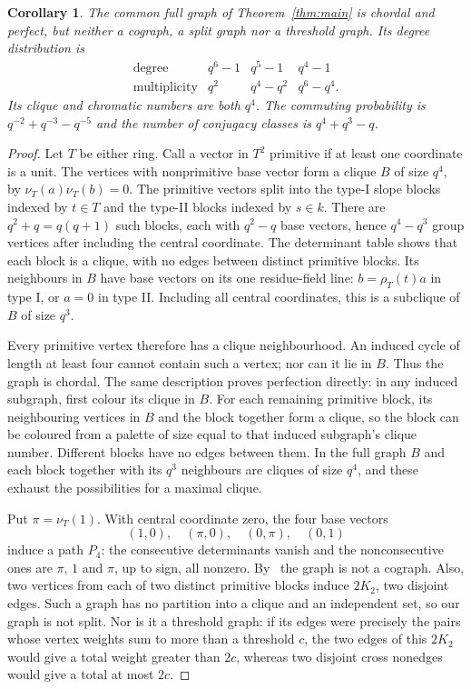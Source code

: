 \documentclass[11pt]{article}
\newtheorem{corollary}[theorem]{Corollary}
\begin{document}
\begin{corollary}\label{cor:structure}
The common full graph of Theorem~\ref{thm:main} is chordal and perfect,
but neither a cograph, a split graph nor a threshold graph.
Its degree distribution is
\[
\begin{array}{c|ccc}
\text{degree} &q^6-1&q^5-1&q^4-1\\
\text{multiplicity}&q^2&q^4-q^2&q^6-q^4.
\end{array}
\]
Its clique and chromatic numbers are both $q^4$. The commuting
probability is $q^{-2}+q^{-3}-q^{-5}$ and the number of conjugacy classes
is $q^4+q^3-q$.
\end{corollary}
\begin{proof}
Let $T$ be either ring. Call a vector in $T^2$ primitive if at least one
coordinate is a unit. The vertices with nonprimitive base vector form
a clique $B$ of size $q^4$, by $\nu_T(a)\nu_T(b)=0$.
The primitive vectors split into the type-I slope blocks indexed by
$t\in T$ and the type-II blocks indexed by $s\in k$. There are
$q^2+q=q(q+1)$ such blocks, each with $q^2-q$ base vectors, hence
$q^4-q^3$ group vertices after including the central coordinate.
The determinant table shows that each block is a clique, with no edges
between distinct primitive blocks. Its neighbours in $B$ have base
vectors on its one residue-field line: $b=\rho_T(t)a$ in type I,
or $a=0$ in type II. Including all central coordinates, this is a
subclique of $B$ of size $q^3$.

Every primitive vertex therefore has a clique neighbourhood. An induced
cycle of length at least four cannot contain such a vertex; nor can it
lie in $B$. Thus the graph is chordal. The same description proves
perfection directly: in any induced subgraph, first colour its clique
in $B$. For each remaining primitive block, its neighbouring vertices
in $B$ and the block together form a clique, so the block can be coloured
from a palette of size equal to that induced subgraph's clique number.
Different blocks have no edges between them. In the full graph $B$ and
each block together with its $q^3$ neighbours are cliques of size $q^4$,
and these exhaust the possibilities for a maximal clique.

Put $\pi=\nu_T(1)$. With central coordinate zero, the four base vectors
\[
 (1,0),\quad (\pi,0),\quad(0,\pi),\quad(0,1)
\]
induce a path $P_4$: the consecutive determinants vanish and the
nonconsecutive ones are $\pi$, $1$ and $\pi$, up to sign, all nonzero.
By~\cite[Proposition~10.1]{ACMM} the graph is not a cograph.
Also, two vertices from each of two distinct primitive blocks induce
$2K_2$, two disjoint edges. Such a graph has no partition into a clique
and an independent set, so our graph is not split.
Nor is it a threshold graph: if its edges were precisely the pairs
whose vertex weights sum to more than a threshold $c$, the two edges
of this $2K_2$ would give a total weight greater than $2c$, whereas
two disjoint cross nonedges would give a total at most $2c$.


\end{proof}
\end{document}
